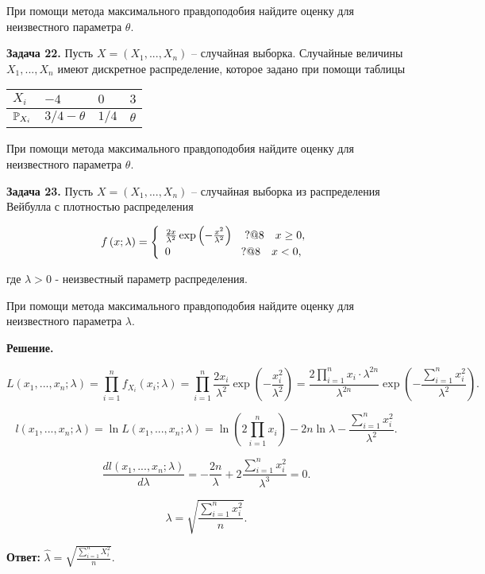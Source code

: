 При помощи метода максимального правдоподобия найдите оценку для неизвестного параметра $\theta $.



\textbf{Задача 22.} Пусть $X=\left(X_{1} ,...,X_{n} \right)$ -- случайная выборка. Случайные величины $X_{1} ,...,X_{n} $ имеют дискретное распределение, которое задано при помощи таблицы

\begin{tabular}{|p{0.6in}|p{0.6in}|p{0.6in}|p{0.6in}|} \hline 
$X_{i} $ & $-4$ & $0$ & $3$ \\ \hline 
${\rm {\mathbb P}}_{X_{i} } $ & $3/4-\theta $ & $1/4$ & $\theta $ \\ \hline 
\end{tabular}

При помощи метода максимального правдоподобия найдите оценку для неизвестного параметра $\theta $.



\textbf{Задача 23.} Пусть $X=\left(X_{1} ,...,X_{n} \right)$ -- случайная выборка из распределения Вейбулла с плотностью распределения

\[f\left(x;\lambda \right)=\left\{\begin{array}{l} {\frac{2x}{\lambda ^{2} } \exp \left(-\frac{x^{2} }{\lambda ^{2} } \right)\quad {\rm ?@8}\quad x\ge 0,} \\ {0\quad \quad \quad \quad \quad \quad \; {\kern 1pt} {\rm ?@8}\quad x<0,} \end{array}\right. \] 

где $\lambda >0$ - неизвестный параметр распределения.

При помощи метода максимального правдоподобия найдите оценку для неизвестного параметра $\lambda $.

\textbf{Решение.}

\[L\left(x_{1} ,...,x_{n} ;\lambda \right)=\prod _{i=1}^{n}f_{X_{i} } \left(x_{i} ;\lambda \right) =\prod _{i=1}^{n}\frac{2x_{i} }{\lambda ^{2} } \exp \left(-\frac{x_{i}^{2} }{\lambda ^{2} } \right) =\frac{2\prod _{i=1}^{n}x_{i}  \cdot \lambda ^{2n} }{\lambda ^{2n} } \exp \left(-\frac{\sum _{i=1}^{n}x_{i}^{2}  }{\lambda ^{2} } \right).\] 

\[l\left(x_{1} ,...,x_{n} ;\lambda \right)=\ln L\left(x_{1} ,...,x_{n} ;\lambda \right)=\ln \left(2\prod _{i=1}^{n}x_{i}  \right)-2n\ln \lambda -\frac{\sum _{i=1}^{n}x_{i}^{2}  }{\lambda ^{2} } .\] 

\[\frac{dl\left(x_{1} ,...,x_{n} ;\lambda \right)}{d\lambda } =-\frac{2n}{\lambda } +2\frac{\sum _{i=1}^{n}x_{i}^{2}  }{\lambda ^{3} } =0.\] 

\[\lambda =\sqrt{\frac{\sum _{i=1}^{n}x_{i}^{2}  }{n} } .\] 

\textbf{Ответ:} $\widehat{\lambda }=\sqrt{\frac{\sum _{i=1}^{n}X_{i}^{2}  }{n} } $.



